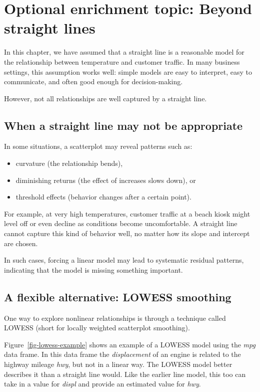 \documentclass[
  12pt,
  letterpaper,
  DIV=11,
  numbers=noendperiod]{scrreprt}
\begin{document}
\section{Optional enrichment topic: Beyond straight
lines}\label{optional-enrichment-topic-beyond-straight-lines}

In this chapter, we have assumed that a straight line is a reasonable
model for the relationship between temperature and customer traffic. In
many business settings, this assumption works well: simple models are
easy to interpret, easy to communicate, and often good enough for
decision-making.

However, not all relationships are well captured by a straight line.

\subsection{When a straight line may not be
appropriate}\label{when-a-straight-line-may-not-be-appropriate}

In some situations, a scatterplot may reveal patterns such as:

\begin{itemize}
\item
  curvature (the relationship bends),
\item
  diminishing returns (the effect of increases slows down), or
\item
  threshold effects (behavior changes after a certain point).
\end{itemize}

For example, at very high temperatures, customer traffic at a beach
kiosk might level off or even decline as conditions become
uncomfortable. A straight line cannot capture this kind of behavior
well, no matter how its slope and intercept are chosen.

In such cases, forcing a linear model may lead to systematic residual
patterns, indicating that the model is missing something important.

\subsection{A flexible alternative: LOWESS
smoothing}\label{a-flexible-alternative-lowess-smoothing}

One way to explore nonlinear relationships is through a technique called
LOWESS (short for locally weighted scatterplot smoothing).

Figure~\ref{fig-lowess-example} shows an example of a LOWESS model using
the \emph{mpg} data frame. In this data frame the \emph{displacement} of
an engine is related to the highway mileage \emph{hwy}, but not in a
linear way. The LOWESS model better describes it than a straight line
would. Like the earlier line model, this too can take in a value for
\emph{displ} and provide an estimated value for \emph{hwy}.
\end{document}
